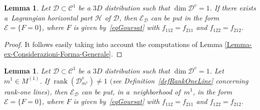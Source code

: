 \documentclass[10pt,a4paper]{amsart}
\newcommand{\E}{\mathcal{E}}
\newcommand{\rank}{\operatorname{rank}}
\numberwithin{equation}{section}
\newtheorem{Lemma}[Theorem]{Lemma}
\begin{document}
\begin{Lemma}\label{lemma.appoggio.gianni}
Let $\mathcal{D}\subset\mathcal{C}^1$ be a $3D$ distribution such that $\dim\mathcal{D}^v=1$. If there exists a~Lag\-rangian horizontal part $\mathcal{H}$ of $\mathcal{D}$, then $\mathcal{E}_{\mathcal D}$ can be put in the form $\E=\{F=0\}$, where $F$ is given by~\eqref{eqGoursat} with $f_{112}=f_{211}$ and $f_{122}=f_{212}$.
\end{Lemma}

\begin{proof}
It follows easily taking into account the computations of Lemma \ref{Lemma-ex-Considerazioni-Forma-Generale}.
\end{proof}

\begin{Lemma}\label{lemma.optimal}
Let $\mathcal{D}\subset\mathcal{C}^1$ be a $3D$ distribution such that $\dim\mathcal{D}^v=1$. Let $m^1\in M^{(1)}$. If $\rank(\mathcal{D}^v_{m^1})\neq 1$ $($see Definition~{\rm \ref{defRankOneLine}} concerning rank-one lines$)$, then $\mathcal{E}_{\mathcal D}$ can be put, in a~neighborhood of~$m^1$, in the form $\E=\{F=0\}$, where $F$ is given by~\eqref{eqGoursat} with $f_{112}=f_{211}$ and $f_{122}=f_{212}$.
\end{Lemma}
\end{document}
